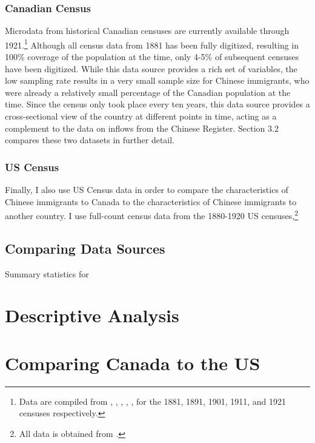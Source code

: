 \documentclass[12pt]{article}
\begin{document}
\subsubsection{Canadian Census}
Microdata from historical Canadian censuses are currently available through 1921.\footnote{Data are compiled from \citet{census1881}, \citet{census1891}, \citet{census1901}, \citet{census1911}, \citet{census1921}, for the 1881, 1891, 1901, 1911, and 1921 censuses respectively.} 
Although all census data from 1881 has been fully digitized, resulting in 100\% coverage of the population at the time, only 4-5\% of subsequent censuses have been digitized.
While this data source provides a rich set of variables, the low sampling rate results in a very small sample size for Chinese immigrants, who were already a relatively small percentage of the Canadian population at the time.
Since the census only took place every ten years, this data source provides a cross-sectional view of the country at different points in time, acting as a complement to the data on inflows from the Chinese Register.
Section 3.2 compares these two datasets in further detail.

\subsubsection{US Census}
Finally, I also use US Census data in order to compare the characteristics of Chinese immigrants to Canada to the characteristics of Chinese immigrants to another country.
I use full-count census data from the 1880-1920 US censuses,\footnote{All data is obtained from \citet{ipums}.} 

\subsection{Comparing Data Sources}

\begin{table}[!h]
    \centering 
    \caption{Summary statistics for }
    \resizebox{\textwidth}{!}{
    
    }
\end{table}


\section{Descriptive Analysis}


\section{Comparing Canada to the US}
\end{document}
